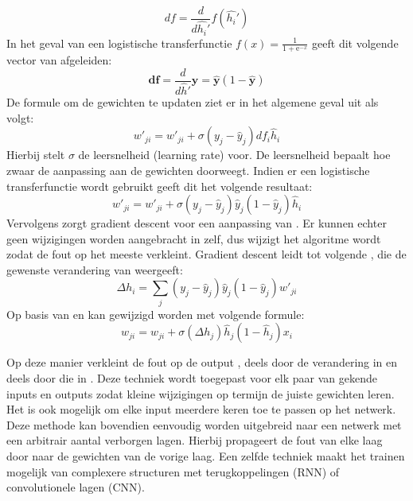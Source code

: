 \begin{equation}
df = \frac{d}{d\hat{h_i}'}f(\hat{h_i}')
\end{equation}
In het geval van een logistische transferfunctie $f(x) = \frac{1}{1 + \mathrm e^{-x}}$ geeft dit volgende vector van afgeleiden:
\begin{equation}
  \mathbf{df} = \frac{d}{d\hat{h}'}\mathbf{\hat{y}} = \mathbf{\hat{y}}(1-\mathbf{\hat{y}})
\end{equation}
De formule om de gewichten te updaten ziet er in het algemene geval uit als volgt:
\begin{equation}
  w'_{ji} = w'_{ji} + \sigma(y_j-\hat{y}_j)df_i\hat{h}_i
\end{equation}
Hierbij stelt $\sigma$ de leersnelheid (learning rate) voor. De leersnelheid bepaalt hoe zwaar de aanpassing aan de gewichten doorweegt.
Indien er een logistische transferfunctie wordt gebruikt geeft dit het volgende resultaat:
\begin{equation}
    w'_{ji} = w'_{ji} + \sigma(y_j-\hat{y}_j)\hat{y}_j(1-\hat{y}_j)\hat{h}_i
\end{equation}
Vervolgens zorgt gradient descent voor een aanpassing van . Er kunnen echter geen wijzigingen worden aangebracht in  zelf, dus wijzigt het algoritme  wordt zodat de fout op  het meeste verkleint. Gradient descent leidt tot volgende , die de gewenste verandering van  weergeeft:
\begin{equation}
    \Delta h_i = \sum\limits_{j}(y_j-\hat{y}_j)\hat{y}_j(1-\hat{y}_j)w'_{ji}
\end{equation}
Op basis van  en  kan  gewijzigd worden met volgende formule:
\begin{equation}
    w_{ji} = w_{ji} + \sigma(\Delta h_j)\hat{h}_j(1-\hat{h}_j)x_i
\end{equation}

Op deze manier verkleint de fout op de output , deels door de verandering in  en deels door die in .
Deze techniek wordt toegepast voor elk paar van gekende inputs en outputs zodat kleine wijzigingen op termijn de juiste gewichten leren. Het is ook mogelijk om elke input meerdere keren toe te passen op het netwerk. Deze methode kan bovendien eenvoudig worden uitgebreid naar een netwerk met een arbitrair aantal verborgen lagen. Hierbij propageert de fout van elke laag door naar de gewichten van de vorige laag. Een zelfde techniek maakt het trainen mogelijk van complexere structuren met terugkoppelingen (RNN) of convolutionele lagen (CNN).

